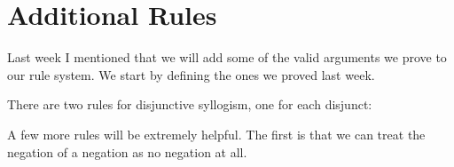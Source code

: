 
\section{Additional Rules}

Last week I mentioned that we will add some of the valid arguments we prove
to our rule system. We start by defining the ones we proved last week.

\begin{fitchrule}
  \label{def:disjunctive-syllogism-rule}
  \leavevmode
  There are two rules for disjunctive syllogism, one for each disjunct:\\
\end{fitchrule}

\begin{fitchrule}
  \label{def:excluded-middle-rule}
  \leavevmode
  \vspace{-0.9\baselineskip}
  \begin{fitchproof}
    \open
     {\ephi}      
     {\epsi}
    \close
    \open
     {\enot\ephi} 
     {\epsi}
    \close
     {\epsi}      
  \end{fitchproof}    
\end{fitchrule}

A few more rules will be extremely helpful. The first is that we can treat the
negation of a negation as no negation at all.

\begin{fitchrule}
  \label{def:double-negative-rule}
  \leavevmode
  \vspace{-0.9\baselineskip}
  \begin{fitchproof}
     {\enot\enot\ephi}
     {\ephi} 
  \end{fitchproof}
\end{fitchrule}

